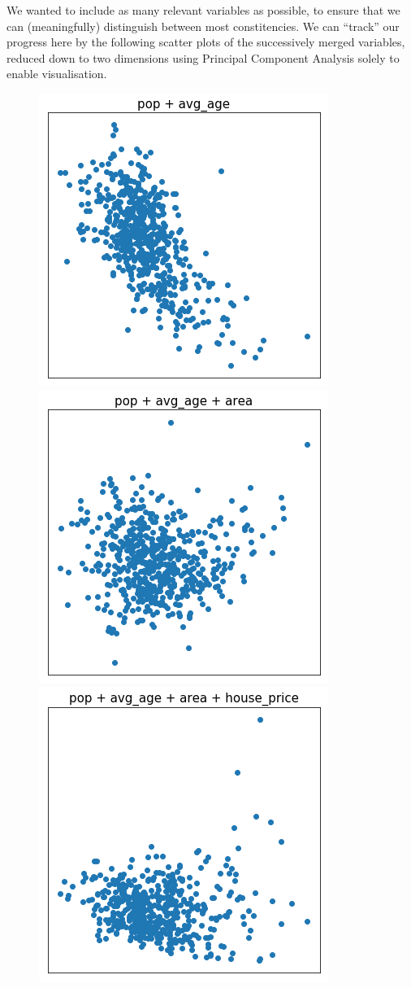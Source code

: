 \documentclass[a4paper, 11pt]{article}
\begin{document}
We wanted to include as many relevant variables as possible, to ensure that we can (meaningfully) distinguish between most constitencies. We can ``track'' our progress here by the following scatter plots of the successively merged variables, reduced down to two dimensions using Principal Component Analysis solely to enable visualisation.

\begin{figure}
\includegraphics[scale=.32]{../gfx/cluster0.png}
\includegraphics[scale=.32]{../gfx/cluster1.png}
\includegraphics[scale=.32]{../gfx/cluster2.png}\\

\end{figure}
\end{document}

